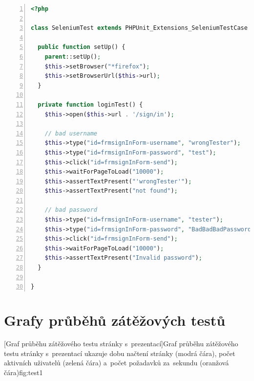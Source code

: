 \documentclass[11pt,twoside,a4paper]{book}
\begin{document}
\newpage

\begin{lstlisting}[caption={Ukázka Selenium testu},label={lst:seleniumtest},
language=php,
numbers=left,
breaklines=true]
<?php

class SeleniumTest extends PHPUnit_Extensions_SeleniumTestCase {

  public function setUp() {
    parent::setUp();
    $this->setBrowser("*firefox");
    $this->setBrowserUrl($this->url);
  }

  private function loginTest() {
    $this->open($this->url . '/sign/in');

    // bad username
    $this->type("id=frmsignInForm-username", "wrongTester");
    $this->type("id=frmsignInForm-password", "test");
    $this->click("id=frmsignInForm-send");
    $this->waitForPageToLoad("10000");
    $this->assertTextPresent("'wrongTester'");
    $this->assertTextPresent("not found");

    // bad password
    $this->type("id=frmsignInForm-username", "tester");
    $this->type("id=frmsignInForm-password", "BadBadBadPassword");
    $this->click("id=frmsignInForm-send");
    $this->waitForPageToLoad("10000");
    $this->assertTextPresent("Invalid password");
  }
  
}
\end{lstlisting}

\chapter{Grafy průběhů zátěžových testů}\label{chap:loadtest}

%
[Graf průběhu zátěžového testu stránky s~prezentací]{Graf průběhu zátěžového testu stránky s~prezentací ukazuje dobu načtení stránky (modrá čára), počet aktivních uživatelů (zelená čára) a~počet požadavků za~sekundu (oranžová čára)}{fig:test1}
\end{document}
